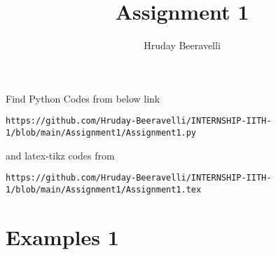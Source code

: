 \documentclass[journal,12pt,twocolumn]{IEEEtran}
\begin{document}
\providecommand{\fourier}{\overset{\mathcal{F}}{ \rightleftharpoons}}
\providecommand{\system}{\overset{\mathcal{H}}{ \longleftrightarrow}}
\newcommand{\solution}{\noindent \textbf{Solution: }}
\newcommand{\cosec}{\,\text{cosec}\,}
\providecommand{\dec}[2]{\ensuremath{\overset{#1}{\underset{#2}{\gtrless}}}}
\newcommand{\myvec}[1]{\ensuremath{\begin{pmatrix}#1\end{pmatrix}}}
\newcommand{\mydet}[1]{\ensuremath{\begin{vmatrix}#1\end{vmatrix}}}
\makeatletter
{}
\makeatother
\let\StandardTheFigure\thefigure
\let\vec\mathbf
\renewcommand{\thefigure}{\theproblem}
\def\putbox#1#2#3{\makebox[0in][l]{\makebox[#1][l]{}\raisebox{\baselineskip}[0in][0in]{\raisebox{#2}[0in][0in]{#3}}}}
     \def\rightbox#1{\makebox[0in][r]{#1}}
     \def\centbox#1{\makebox[0in]{#1}}
     \def\topbox#1{\raisebox{-\baselineskip}[0in][0in]{#1}}
     \def\midbox#1{\raisebox{-0.5\baselineskip}[0in][0in]{#1}}
\vspace{3cm}
\title{Assignment 1}
\author{Hruday Beeravelli}
\maketitle
\newpage
\bigskip
\renewcommand{\thefigure}{\theenumi}
\renewcommand{\thetable}{\theenumi}
Find Python Codes from below link 
%
\begin{lstlisting}
https://github.com/Hruday-Beeravelli/INTERNSHIP-IITH-1/blob/main/Assignment1/Assignment1.py
\end{lstlisting}
%
and latex-tikz codes from 
%
\begin{lstlisting}
https://github.com/Hruday-Beeravelli/INTERNSHIP-IITH-1/blob/main/Assignment1/Assignment1.tex
\end{lstlisting}
%

\section{Examples 1}
\end{document}
